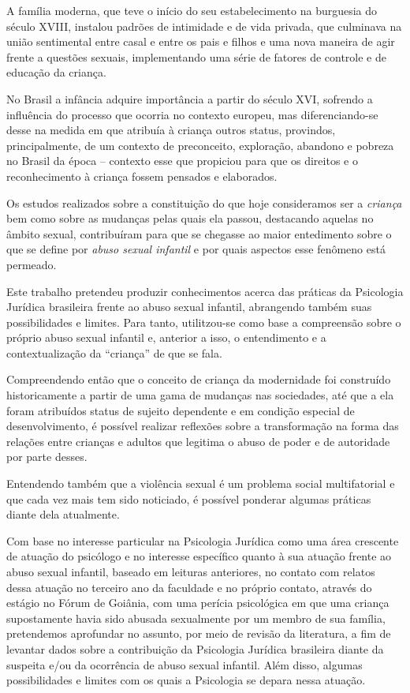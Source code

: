 A família moderna, que teve o início do seu estabelecimento na burguesia do século XVIII, instalou padrões de intimidade e de vida privada, que culminava na união sentimental entre casal e entre os pais e filhos \cite{ARIES2011} e uma nova maneira de agir frente a questões sexuais, implementando uma série de fatores de controle e de educação da criança. 

No Brasil a infância adquire importância a partir do século XVI, sofrendo a influência do processo que ocorria no contexto europeu, mas diferenciando-se desse na medida em que atribuía à criança outros status, provindos, principalmente, de um contexto de preconceito, exploração, abandono e pobreza no Brasil da época – contexto esse que propiciou para que os direitos e o reconhecimento à criança fossem pensados e elaborados. 

Os estudos realizados sobre a constituição do que hoje consideramos ser a \emph{criança} bem como sobre as mudanças pelas quais ela passou, destacando aquelas no âmbito sexual, contribuíram para que se chegasse ao maior entedimento sobre o que se define por \emph{abuso sexual infantil} e por quais aspectos esse fenômeno está permeado.

Este trabalho pretendeu produzir conhecimentos acerca das práticas da Psicologia Jurídica brasileira frente ao abuso sexual infantil, abrangendo também suas possibilidades e limites. Para tanto, utilitzou-se como base a compreensão sobre o próprio abuso sexual infantil e, anterior a isso, o entendimento e a contextualização da ``criança'' de que se fala. 

Compreendendo então que o conceito de criança da modernidade foi construído historicamente a partir de uma gama de mudanças nas sociedades, até que a ela foram atribuídos status de sujeito dependente e em condição especial de desenvolvimento, é possível realizar reflexões sobre a transformação na forma das relações entre crianças e adultos que legitima o abuso de poder e de autoridade por parte desses.

Entendendo também que a violência sexual é um problema social multifatorial e que cada vez mais tem sido noticiado, é possível ponderar algumas práticas diante dela atualmente.

Com base no interesse particular na Psicologia Jurídica como uma área crescente de atuação do psicólogo e no interesse específico quanto à sua atuação frente ao abuso sexual infantil, baseado em leituras anteriores, no contato com relatos dessa atuação no terceiro ano da faculdade e no próprio contato, através do estágio no Fórum de Goiânia, com uma perícia psicológica em que uma criança supostamente havia sido abusada sexualmente por um membro de sua família, pretendemos aprofundar no assunto, por meio de revisão da literatura, a fim de levantar dados sobre a contribuição da Psicologia Jurídica brasileira diante da suspeita e/ou da ocorrência de abuso sexual infantil. Além disso, algumas possibilidades e limites com os quais a Psicologia se depara nessa atuação. 

